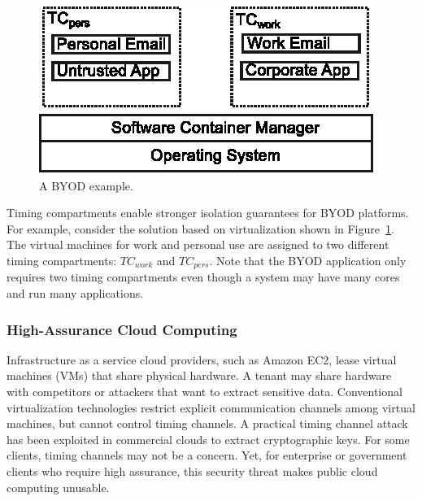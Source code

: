 \begin{figure}
    \begin{center}
        \includegraphics{figs/byod.eps}
        \caption{A BYOD example.}
        \label{fig:byod}
    \end{center}
\end{figure}

Timing compartments enable stronger isolation guarantees for BYOD
platforms. For example, consider the solution based on virtualization shown in 
Figure~\ref{fig:byod}. The virtual machines for
work and personal use are assigned to two different timing compartments:
$TC_{work}$ and $TC_{pers}$. 
Note that the BYOD application only requires two timing compartments even
though a system may have many cores and run many applications.

\subsubsection{High-Assurance Cloud Computing}

Infrastructure as a service cloud providers, such as Amazon EC2, lease virtual 
machines (VMs) that share physical hardware. 
A tenant may share hardware with competitors or attackers that want
to extract sensitive data. Conventional virtualization technologies restrict 
explicit
communication channels among virtual machines, but cannot control 
timing channels. A practical timing channel attack has been exploited
in commercial clouds to extract cryptographic keys\cite{heyyou}.
For some clients, timing channels may not be a concern. Yet, for enterprise or 
government clients who require high assurance,
this security threat makes public cloud computing unusable. 

